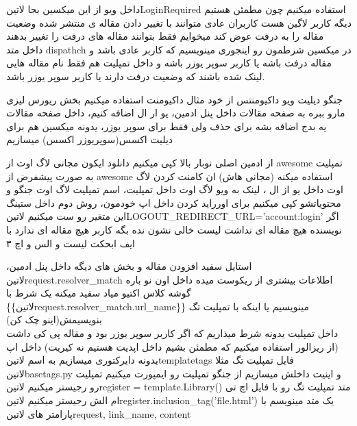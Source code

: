 \documentclass{article}
\begin{document}
	 	داخل ویو از این میکسین بجا ‌لاتین{LoginRequired} استفاده میکنیم چون مطمئن هستیم دیگه کاربر لاگین هست
	 کاربران عادی متوانند با تغییر دادن مقاله ی منتشر شده وضعیت مقاله را به درفت عوض کند میخوایم فقط بتوانند مقاله های درفت را تغییر
	 بدهند\\
	 	داخل متد dispathch در میکسین شرطمون رو اینجوری مینویسیم که کاربر عادی باشد و مقاله درفت باشه یا کاربر سوپر یوزر باشه و داخل
	 	تمپلیت هم فقط نام مقاله هایی لینک شده باشند که وضعیت درفت دارند یا کاربر سوپر یوزر باشد.
	 	
	 جنگو دیلیت ویو داکیومنتس از خود مثال داکیومنت استفاده میکنیم بخش ریورس لیزی مارو ببره به صفحه مقالات داخل پنل ادمین،‌ یو ار ال 
	 اضافه کنیم، داخل صفحه مقالات یه بدج اضافه بشه برای حذف ولی فقط برای سوپر یوزر، یدونه میکسین هم برای دیلیت اکسس(سوپریوزر اکسس) میسازیم
	 
	 از ادمین اصلی نوبار بالا کپی میکنیم دانلود ایکون مجانی لاگ اوت از awesome تمپلیت به صورت پیشفرض از awesome استفاده میکنه (مجانی هاش)
	 ان کامنت کردن لاگ اوت داخل یو از ال ، لینک به ویو لاگ اوت داخل تمپلیت، اسم تمپلیت لاگ اوت جنگو و محتویاتشو کپی میکنیم برای اورراید کردن 
	 داخل اپ خودمون، روش دوم داخل ستینگ این متغیر رو ست میکنیم ‌لاتین{LOGOUT\_REDIRECT\_URL='account:login'} 
	  اگر نویسنده هیچ مقاله ای نداشت لیست خالی نشون نده بگه کاربر هیچ مقاله ای ندارد با ایف ابحکت لیست و الس و اچ ۳
	 
	 
	 استایل سفید افزودن مقاله و بخش های دیگه داخل پنل ادمین، ‌لاتین{request.resolver\_match} اطلاعات بیشتری از ریکوست میده
	 داخل اون نو باره گوشه کلاس اکتیو میاد سفید میکنه یک شرط با\\
	  \{\{‌لاتین{request.resolver\_match.url\_name}\}\} مینویسیم یا اینکه با تمپلیت تگ بنویسیمش(اینو چک کن)\\
	  داخل تمپلیت یدونه شرط میذاریم که اگر کاربر سوپر یوزر بود و مقاله پی کی داشت (از ریزالور استفاده میکنیم که مطمئن بشیم داخل 
	  اپدیت هستیم نه کیریت)
	  		 داخل اپ یدونه دایرکتوری میسازیم به اسم ‌لاتین{templatetags}
	  		 فایل تمپلیت تگ مثلا ‌لاتین{basetags.py} و اینیت داخلش میسازیم
	  		 از جنگو تمپلیت رو ایمپورت میکنیم
	  		 تمپلیت رو رجیستر میکنیم ‌لاتین{register = template.Library()}
			 متد تمپلیت تگ رو با فایل اچ تی ام الش رجیستر میکنیم ‌لاتین{register.inclusion\_tag('file.html')}
			 یک متد مینویسم با پارامتر های ‌لاتین{request, link\_name, content}
			
\end{document}

